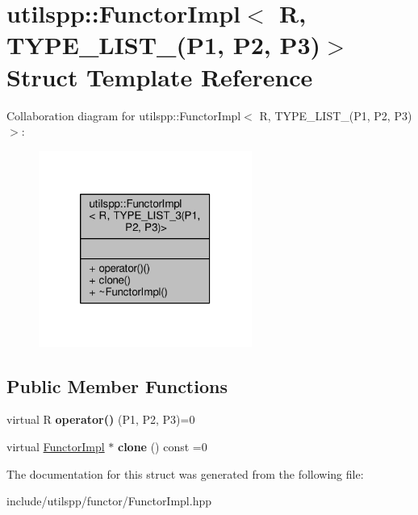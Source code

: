\hypertarget{structutilspp_1_1FunctorImpl_3_01R_00_01TYPE__LIST__3_07P1_00_01P2_00_01P3_08_4}{\section{utilspp\-:\-:Functor\-Impl$<$ R, T\-Y\-P\-E\-\_\-\-L\-I\-S\-T\-\_(P1, P2, P3)$>$ Struct Template Reference}
\label{structutilspp_1_1FunctorImpl_3_01R_00_01TYPE__LIST__3_07P1_00_01P2_00_01P3_08_4}
}


Collaboration diagram for utilspp\-:\-:Functor\-Impl$<$ R, T\-Y\-P\-E\-\_\-\-L\-I\-S\-T\-\_(P1, P2, P3)$>$\-:
\nopagebreak
\begin{figure}[H]
\begin{center}
\leavevmode
\includegraphics[width=198pt]{structutilspp_1_1FunctorImpl_3_01R_00_01TYPE__LIST__3_07P1_00_01P2_00_01P3_08_4__coll__graph}
\end{center}
\end{figure}
\subsection*{Public Member Functions}
\begin{DoxyCompactItemize}
\item 
\hypertarget{structutilspp_1_1FunctorImpl_3_01R_00_01TYPE__LIST__3_07P1_00_01P2_00_01P3_08_4_aa0749bda9ec1d91d2cbc140eea74af55}{virtual R {\bfseries operator()} (P1, P2, P3)=0}\label{structutilspp_1_1FunctorImpl_3_01R_00_01TYPE__LIST__3_07P1_00_01P2_00_01P3_08_4_aa0749bda9ec1d91d2cbc140eea74af55}

\item 
\hypertarget{structutilspp_1_1FunctorImpl_3_01R_00_01TYPE__LIST__3_07P1_00_01P2_00_01P3_08_4_a056fa3f44af013aba8e0369a51020650}{virtual \hyperlink{structutilspp_1_1FunctorImpl}{Functor\-Impl} $\ast$ {\bfseries clone} () const =0}\label{structutilspp_1_1FunctorImpl_3_01R_00_01TYPE__LIST__3_07P1_00_01P2_00_01P3_08_4_a056fa3f44af013aba8e0369a51020650}

\end{DoxyCompactItemize}


The documentation for this struct was generated from the following file\-:\begin{DoxyCompactItemize}
\item 
include/utilspp/functor/Functor\-Impl.\-hpp\end{DoxyCompactItemize}
